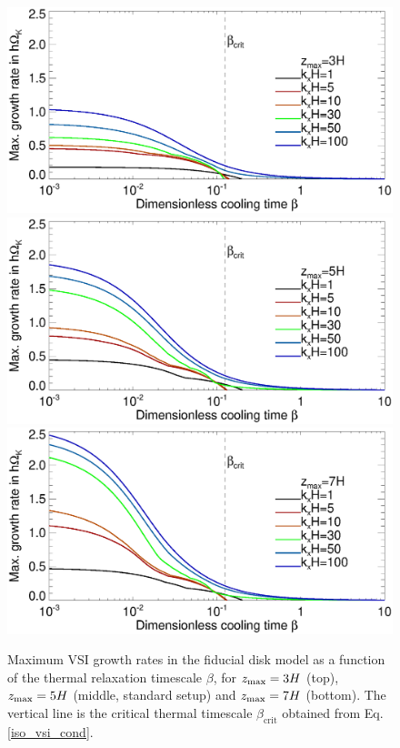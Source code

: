 \begin{figure}
  \includegraphics[width=\linewidth,clip=true,trim=0cm 1.75cm 0cm
  0.9cm]{figures/gcorr_compare_iso_maxrate_z3} 
  \includegraphics[width=\linewidth,clip=true,trim=0cm 1.75cm 0cm
  0.9cm]{figures/gcorr_compare_iso_maxrate_z5} 
  \includegraphics[width=\linewidth,clip=true,trim=0cm 0.0cm 0cm
  0.9cm]{figures/gcorr_compare_iso_maxrate_z7}  
  \caption{Maximum VSI growth rates in the fiducial disk 
     model as a function of the thermal relaxation timescale
     $\beta$, for $z_\mathrm{max}=3H$ (top), $z_\mathrm{max}=5H$ (middle, standard
     setup) and $z_\mathrm{max}=7H$ (bottom). The vertical line is the
     critical thermal timescale $\beta_\mathrm{crit}$ obtained  
     from Eq. \ref{iso_vsi_cond}. 
     \label{bcrit_compare1}}   
 \end{figure} 

